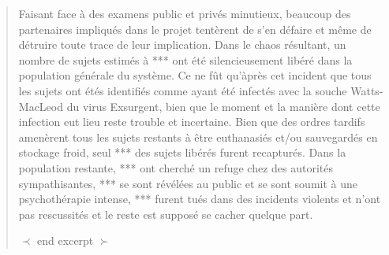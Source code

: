 \begin{quotation}
Faisant face à des examens public et privés minutieux, beaucoup des partenaires impliqués dans le projet tentèrent de s'en défaire  et même de détruire toute trace de leur implication. Dans le chaos résultant, un nombre de sujets estimés à *** ont été silencieusement libéré dans la population générale du système. Ce ne fût qu'àprès cet incident que tous les sujets ont étés identifiés comme ayant été infectés avec la souche Watts-MacLeod du virus Exsurgent, bien que le moment et la manière dont cette infection eut lieu reste trouble et incertaine. Bien que des ordres tardifs amenèrent tous les sujets restants à être euthanasiés et/ou sauvegardés en stockage froid, seul *** des sujets libérés furent recapturés. Dans la population restante, *** ont cherché un refuge chez des autorités sympathisantes, *** se sont révélées au public et se sont soumit à une psychothérapie intense, *** furent tués dans des incidents violents et n'ont pas rescussités et le reste est supposé se cacher quelque part. 

$\prec$ end excerpt $\succ$ \end{quotation} 